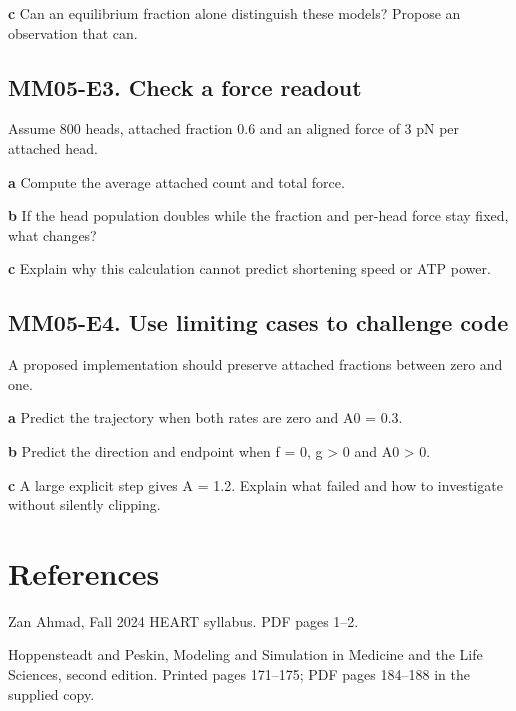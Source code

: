 \documentclass[11pt,letterpaper]{article}
\theoremstyle{definition}\newtheorem{definition}{Definition}\newtheorem{example}{Example}
\numberwithin{equation}{section}
\begin{document}
\textbf{c} Can an equilibrium fraction alone distinguish these models? Propose an observation that can.

\par\noindent\begin{minipage}{\linewidth}
\subsection*{MM05-E3. Check a force readout}
Assume 800 heads, attached fraction 0.6 and an aligned force of 3 pN per attached head.

\textbf{a} Compute the average attached count and total force.

\end{minipage}\par\medskip
\textbf{b} If the head population doubles while the fraction and per-head force stay fixed, what changes?

\textbf{c} Explain why this calculation cannot predict shortening speed or ATP power.

\par\noindent\begin{minipage}{\linewidth}
\subsection*{MM05-E4. Use limiting cases to challenge code}
A proposed implementation should preserve attached fractions between zero and one.

\textbf{a} Predict the trajectory when both rates are zero and A0 =\allowbreak{} 0.3.

\end{minipage}\par\medskip
\textbf{b} Predict the direction and endpoint when f =\allowbreak{} 0, g > 0 and A0 > 0.

\textbf{c} A large explicit step gives A =\allowbreak{} 1.2. Explain what failed and how to investigate without silently clipping.

\section*{References}
\noindent\begin{minipage}{\linewidth}
Zan Ahmad, Fall 2024 HEART syllabus. PDF pages 1--2.

\end{minipage}\par\medskip
\noindent\begin{minipage}{\linewidth}
Hoppensteadt and Peskin, Modeling and Simulation in Medicine and the Life Sciences, second edition. Printed pages 171--175; PDF pages 184--188 in the supplied copy.

\end{minipage}\par\medskip
\end{document}
